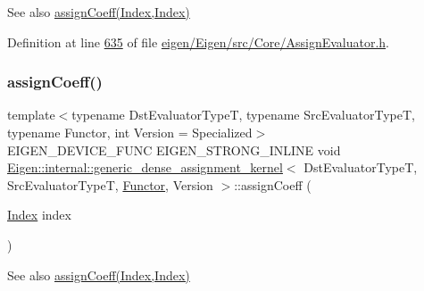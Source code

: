 \begin{DoxySeeAlso}{See also}
\hyperlink{class_eigen_1_1internal_1_1generic__dense__assignment__kernel_a7ca974cc4049f1ef3d6f2feac94ea35b}{assign\+Coeff(\+Index,\+Index)} 
\end{DoxySeeAlso}


Definition at line \hyperlink{eigen_2_eigen_2src_2_core_2_assign_evaluator_8h_source_l00635}{635} of file \hyperlink{eigen_2_eigen_2src_2_core_2_assign_evaluator_8h_source}{eigen/\+Eigen/src/\+Core/\+Assign\+Evaluator.\+h}.

\mbox{\label{class_eigen_1_1internal_1_1generic__dense__assignment__kernel_a9f36120222600d1d843b4253b08a383b}} 
\subsubsection{\texorpdfstring{assign\+Coeff()}{assignCoeff()}\hspace{0.1cm}{\footnotesize\ttfamily [2/2]}}
{\footnotesize\ttfamily template$<$typename Dst\+Evaluator\+TypeT, typename Src\+Evaluator\+TypeT, typename Functor, int Version = Specialized$>$ \\
E\+I\+G\+E\+N\+\_\+\+D\+E\+V\+I\+C\+E\+\_\+\+F\+U\+NC E\+I\+G\+E\+N\+\_\+\+S\+T\+R\+O\+N\+G\+\_\+\+I\+N\+L\+I\+NE void \hyperlink{class_eigen_1_1internal_1_1generic__dense__assignment__kernel}{Eigen\+::internal\+::generic\+\_\+dense\+\_\+assignment\+\_\+kernel}$<$ Dst\+Evaluator\+TypeT, Src\+Evaluator\+TypeT, \hyperlink{struct_functor}{Functor}, Version $>$\+::assign\+Coeff (\begin{DoxyParamCaption}\item[{\hyperlink{namespace_eigen_a62e77e0933482dafde8fe197d9a2cfde}{Index}}]{index }\end{DoxyParamCaption})\hspace{0.3cm}{\ttfamily [inline]}}

\begin{DoxySeeAlso}{See also}
\hyperlink{class_eigen_1_1internal_1_1generic__dense__assignment__kernel_a7ca974cc4049f1ef3d6f2feac94ea35b}{assign\+Coeff(\+Index,\+Index)} 
\end{DoxySeeAlso}


